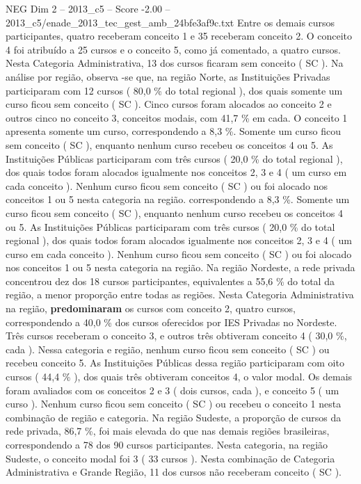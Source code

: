\begin{textsample}{NEG Dim 2 – 2013\_c5 – Score -2.00 – 2013\_c5/enade\_2013\_tec\_gest\_amb\_24bfe3af9c.txt}
Entre os demais cursos participantes, quatro receberam conceito 1 e 35 receberam conceito 2.
O conceito 4 foi atribuído a 25 cursos e o conceito 5, como já comentado, a quatro cursos.
Nesta Categoria Administrativa, 13 dos cursos ficaram sem conceito ( SC ).
Na análise por região, observa -se que, na região Norte, as Instituições Privadas participaram com 12 cursos ( 80,0 \% do total regional ), dos quais somente um curso ficou sem conceito ( SC ).
Cinco cursos foram alocados ao conceito 2 e outros cinco no conceito 3, conceitos modais, com 41,7 \% em cada.
O conceito 1 apresenta somente um curso, correspondendo a 8,3 \%.
Somente um curso ficou sem conceito ( SC ), enquanto nenhum curso recebeu os conceitos 4 ou 5.
As Instituições Públicas participaram com três cursos ( 20,0 \% do total regional ), dos quais todos foram alocados igualmente nos conceitos 2, 3 e 4 ( um curso em cada conceito ).
Nenhum curso ficou sem conceito ( SC ) ou foi alocado nos conceitos 1 ou 5 nesta categoria na região. correspondendo a 8,3 \%.
Somente um curso ficou sem conceito ( SC ), enquanto nenhum curso recebeu os conceitos 4 ou 5.
As Instituições Públicas participaram com três cursos ( 20,0 \% do total regional ), dos quais todos foram alocados igualmente nos conceitos 2, 3 e 4 ( um curso em cada conceito ).
Nenhum curso ficou sem conceito ( SC ) ou foi alocado nos conceitos 1 ou 5 nesta categoria na região.
Na região Nordeste, a rede privada concentrou dez dos 18 cursos participantes, equivalentes a 55,6 \% do total da região, a menor proporção entre todas as regiões.
Nesta Categoria Administrativa na região, \textbf{predominaram} os cursos com conceito 2, quatro cursos, correspondendo a 40,0 \% dos cursos oferecidos por IES Privadas no Nordeste.
Três cursos receberam o conceito 3, e outros três obtiveram conceito 4 ( 30,0 \%, cada ).
Nessa categoria e região, nenhum curso ficou sem conceito ( SC ) ou recebeu conceito 5.
As Instituições Públicas dessa região participaram com oito cursos ( 44,4 \% ), dos quais três obtiveram conceitos 4, o valor modal.
Os demais foram avaliados com os conceitos 2 e 3 ( dois cursos, cada ), e conceito 5 ( um curso ).
Nenhum curso ficou sem conceito ( SC ) ou recebeu o conceito 1 nesta combinação de região e categoria.
Na região Sudeste, a proporção de cursos da rede privada, 86,7 \%, foi mais elevada do que nas demais regiões brasileiras, correspondendo a 78 dos 90 cursos participantes.
Nesta categoria, na região Sudeste, o conceito modal foi 3 ( 33 cursos ).
Nesta combinação de Categoria Administrativa e Grande Região, 11 dos cursos não receberam conceito ( SC ).

\end{textsample}
